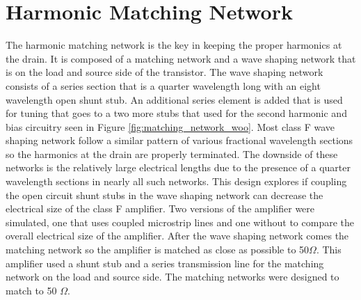


\section{Harmonic Matching Network}

The harmonic matching network is the key in keeping the proper harmonics at the drain. It is composed of a matching network and a wave shaping network that is on the load and source side of the transistor. The wave shaping network consists of a series section that is a quarter wavelength long with an eight wavelength open shunt stub. An additional series element is added that is used for tuning that goes to a two more stubs that used for the second harmonic and bias circuitry seen in Figure \ref{fig:matching_network_woo}. Most class F wave shaping network follow a similar pattern of various fractional wavelength sections so the harmonics at the drain are properly terminated. The downside of these networks is the relatively large electrical lengths due to the presence of a quarter wavelength sections in nearly all such networks. This design explores if coupling the open circuit shunt stubs in the wave shaping network can decrease the electrical size of the class F amplifier. Two versions of the amplifier were simulated, one that uses coupled microstrip lines and one without to compare the overall electrical size of the amplifier. After the wave shaping network comes the matching network so the amplifier is matched as close as possible to 50$\Omega$. This amplifier used a shunt stub and a series transmission line for the matching network on the load and source side. The matching networks were designed to match to 50 $\Omega$.


